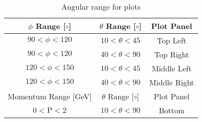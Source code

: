 \begin{table}[h!]
\begin{minipage}{\textwidth}
\begin{center}
\begin{singlespacing}

\caption[Angular Range for  Plots]{\label{tab:tof.pipsec3} Angular range for  plots}
\begin{tabular}{c|c|c}
\hline												
$\phi$ Range [$\circ$]	& $\theta$ Range [$\circ$] & Plot Panel \\ \hline 	
$90 < \phi < 120$ & $10 < \theta < 45$ & Top Left \\
$90 < \phi < 120$ & $40 < \theta < 90$ & Top Right \\
$120 < \phi < 150$ & $10 < \theta < 45$ & Middle Left \\
$120 < \phi < 150$ & $40 < \theta < 90$ & Middle Right \\
\hline												
Momentum Range [GeV]	& $\theta$ Range [$\circ$] & Plot Panel \\ \hline 
$0 < \mathrm{P} < 2$ & $10 < \theta < 90$ & Bottom \\
\hline \hline%
\end{tabular}

\end{singlespacing}
\end{center}
\end{minipage}
\end{table}
\vspace{20pt}